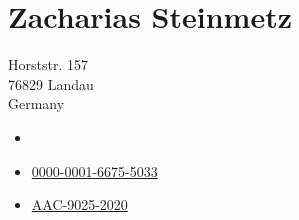 
\reversemarginpar
\fancyhfoffset[RO]{0mm}

\chapter[Curriculum Vitae]{Zacharias Steinmetz}

	\begin{cv}


	\vspace{.5em}

	\noindent
	\begin{minipage}{0.5\linewidth}
		Horststr. 157\\
		76829 Landau\\
		Germany
	\end{minipage}
	\begin{minipage}{0.5\linewidth}
		\begin{itemize}[left=.65em, noitemsep]
			\item[\color{InfRd}\envelope] 
			\item[\href{https://orcid.org/0000-0001-6675-5033}{\orcid}]
			\href{https://orcid.org/0000-0001-6675-5033}{0000-0001-6675-5033}
			\item[\href{https://publons.com/researcher/AAC-9025-2020/}{\publons}]
			\href{https://publons.com/researcher/AAC-9025-2020/}{AAC-9025-2020}
		\end{itemize}
	\end{minipage}


\end{cv}
